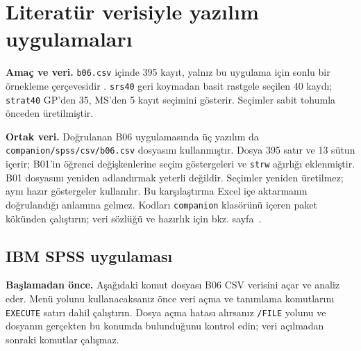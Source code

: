 \section{Literatür verisiyle yazılım uygulamaları}
\label{sec:spss-b06}

\textbf{Amaç ve veri.} \texttt{b06.csv} içinde 395 kayıt, yalnız bu
uygulama için sonlu bir örnekleme çerçevesidir \citep{cortez2008data}.
\texttt{srs40} geri koymadan basit rastgele seçilen 40 kaydı;
\texttt{strat40} GP'den 35, MS'den 5 kayıt seçimini gösterir. Seçimler sabit
tohumla önceden üretilmiştir.

\textbf{Ortak veri.} Doğrulanan B06 uygulamasında üç yazılım da
\nolinkurl{companion/spss/csv/b06.csv} dosyasını kullanmıştır. Dosya
395 satır ve 13 sütun içerir; B01'in öğrenci değişkenlerine seçim
göstergeleri ve \texttt{strw} ağırlığı eklenmiştir. B01 dosyasını yeniden
adlandırmak yeterli değildir. Seçimler yeniden üretilmez; aynı hazır
göstergeler kullanılır. Bu karşılaştırma Excel içe aktarmanın doğrulandığı
anlamına gelmez. Kodları \texttt{companion} klasörünü içeren paket kökünden
çalıştırın; veri sözlüğü ve hazırlık için bkz. sayfa~\pageref{sec:spss-guide}.

\subsection{IBM SPSS uygulaması}
\textbf{Başlamadan önce.} Aşağıdaki komut dosyası B06 CSV verisini
açar ve analiz eder. Menü yolunu kullanacaksanız önce veri açma ve
tanımlama komutlarını \texttt{EXECUTE} satırı dahil çalıştırın.
Dosya açma hatası alırsanız \texttt{/FILE} yolunu ve dosyanın gerçekten
bu konumda bulunduğunu kontrol edin; veri açılmadan sonraki komutlar
çalışmaz.

\begin{spssadimlar}
\end{spssadimlar}

